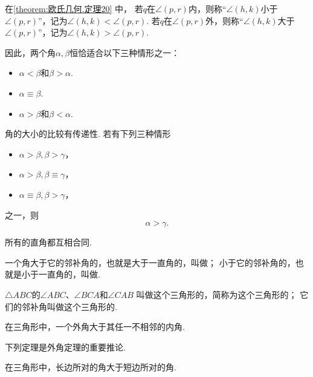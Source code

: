 \begin{definition}
在\cref{theorem:欧氏几何.定理20} 中，
若\(q\)在\(\angle(p,r)\)内，则称“\(\angle(h,k)\)小于\(\angle(p,r)\)”，记为\(\angle(h,k) < \angle(p,r)\).
若\(q\)在\(\angle(p,r)\)外，则称“\(\angle(h,k)\)大于\(\angle(p,r)\)”，记为\(\angle(h,k) > \angle(p,r)\).
\end{definition}

因此，两个角\(\alpha,\beta\)恒恰适合以下三种情形之一：
\begin{itemize}
	\item \(\alpha<\beta\)和\(\beta>\alpha\).
	\item \(\alpha\equiv\beta\).
	\item \(\alpha>\beta\)和\(\beta<\alpha\).
\end{itemize}

角的大小的比较有传递性.
若有下列三种情形
\begin{itemize}
	\item \(\alpha>\beta,\beta>\gamma\)，
	\item \(\alpha>\beta,\beta\equiv\gamma\)，
	\item \(\alpha\equiv\beta,\beta>\gamma\)，
\end{itemize}
之一，则\begin{equation*}
	\alpha>\gamma.
\end{equation*}

\begin{theorem}\label{theorem:欧氏几何.定理21}
所有的直角都互相合同.
\end{theorem}

\begin{definition}
一个角大于它的邻补角的，也就是大于一直角的，叫做；
小于它的邻补角的，也就是小于一直角的，叫做.
\end{definition}

\begin{definition}
\(\triangle ABC\)的\(\angle ABC\)、\(\angle BCA\)和\(\angle CAB\)
叫做这个三角形的，简称为这个三角形的；
它们的邻补角叫做这个三角形的.
\end{definition}

\begin{theorem}[外角定理]\label{theorem:欧氏几何.定理22}
在三角形中，一个外角大于其任一不相邻的内角.
\end{theorem}

下列定理是外角定理的重要推论.

\begin{theorem}\label{theorem:欧氏几何.定理23}
在三角形中，长边所对的角大于短边所对的角.
\end{theorem}

